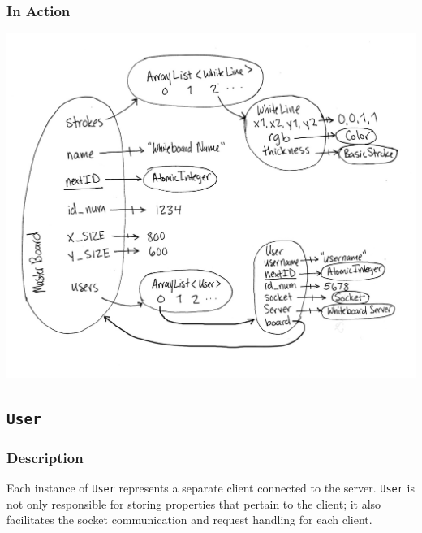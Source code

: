 \subsubsection{In Action}
\includegraphics[keepaspectratio=1,width=6in]{img/wb-snapshot.jpg}


\subsection{\texttt{User}}

\subsubsection{Description}
Each instance of \texttt{User} represents a separate client connected to the server. \texttt{User} is not only responsible for storing properties that pertain to the client; it also facilitates the socket communication and request handling for each client.

